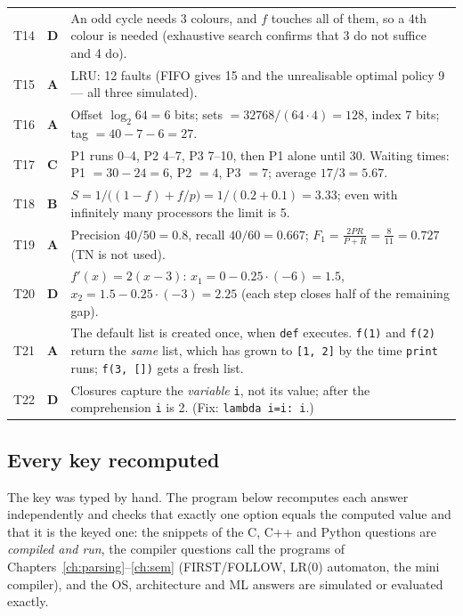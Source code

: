 \documentclass[10pt,a4paper,openany,oneside]{report}
\newcommand{\prio}[1]{\texorpdfstring{\ifcase#1\or{\color{gold}\ding{72}}\or{\color{gold}\ding{72}\ding{72}}\or{\color{gold}\ding{72}\ding{72}\ding{72}}\fi}{}}
\begin{document}
\begin{center}
\begin{xltabular}{\textwidth}{@{}L{0.9cm}L{0.7cm}Y@{}}
T14 & \textbf{D} & An odd cycle needs 3 colours, and $f$ touches all of them, so a 4th colour is needed (exhaustive search confirms that 3 do not suffice and 4 do).\\
T15 & \textbf{A} & LRU: 12 faults (FIFO gives 15 and the unrealisable optimal policy 9 --- all three simulated).\\
T16 & \textbf{A} & Offset $\log_2 64=6$ bits; sets $=32768/(64\cdot4)=128$, index 7 bits; tag $=40-7-6=27$.\\
T17 & \textbf{C} & P1 runs 0--4, P2 4--7, P3 7--10, then P1 alone until 30. Waiting times: P1 $=30-24=6$, P2 $=4$, P3 $=7$; average $17/3=5.67$.\\
T18 & \textbf{B} & $S=1/\big((1-f)+f/p\big)=1/(0.2+0.1)=3.33$; even with infinitely many processors the limit is 5.\\
T19 & \textbf{A} & Precision $40/50=0.8$, recall $40/60=0.667$; $F_1=\frac{2PR}{P+R}=\frac8{11}=0.727$ (TN is not used).\\
T20 & \textbf{D} & $f'(x)=2(x-3)$: $x_1=0-0.25\cdot(-6)=1.5$, $x_2=1.5-0.25\cdot(-3)=2.25$ (each step closes half of the remaining gap).\\
T21 & \textbf{A} & The default list is created once, when \texttt{def} executes. \texttt{f(1)} and \texttt{f(2)} return the \emph{same} list, which has grown to \texttt{[1, 2]} by the time \texttt{print} runs; \texttt{f(3, [])} gets a fresh list.\\
T22 & \textbf{D} & Closures capture the \emph{variable} \texttt{i}, not its value; after the comprehension \texttt{i} is 2. (Fix: \texttt{lambda i=i: i}.)\\
\bottomrule
\end{xltabular}
\end{center}

\subsection{Every key recomputed \prio{1}}
The key was typed by hand. The program below recomputes each answer independently and checks that exactly one option equals the computed value and that it is the keyed one: the snippets of the C, C++ and Python questions are \emph{compiled and run}, the compiler questions call the programs of Chapters~\ref{ch:parsing}--\ref{ch:sem} (FIRST/FOLLOW, LR(0) automaton, the mini compiler), and the OS, architecture and ML answers are simulated or evaluated exactly.
\end{document}
